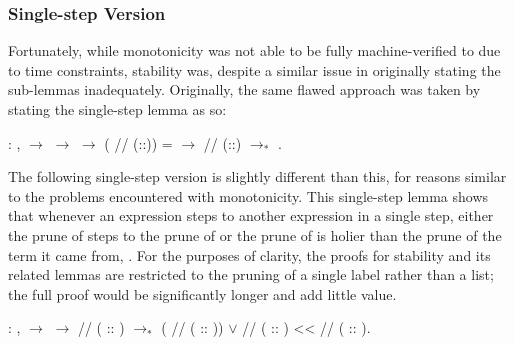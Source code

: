 \documentclass[12pt]{report}
\begin{document}
\subsubsection{Single-step Version}



Fortunately, while monotonicity was not able to be fully
machine-verified to due to time constraints, stability was, despite
a similar issue in originally stating the sub-lemmas inadequately.
Originally, the same flawed approach was taken by stating the
single-step lemma as so:

\begin{coqdoccode}
\coqdocemptyline
\coqdocindent{1.00em}
  : \coqdockw{\ensuremath{\forall}}   ,\coqdoceol
\coqdocindent{2.00em}
  \ensuremath{\rightarrow}\coqdoceol
\coqdocindent{2.00em}
 $\to$  \ensuremath{\rightarrow}\coqdoceol
\coqdocindent{2.00em}
(  //\coqdocvar{\_} (::)) =  \ensuremath{\rightarrow}\coqdoceol
\coqdocindent{2.00em}
  //\coqdocvar{\_} (::) $\to_*$ .\coqdoceol
\coqdocemptyline
\end{coqdoccode}

The following single-step version is slightly different than this,
for reasons similar to the problems encountered with monotonicity.
This single-step lemma shows that whenever an expression
 steps to another expression  in a single
step, either the prune of  steps to the prune of
 or the prune of  is holier than the prune
of the term it came from, . For the purposes of clarity,
the proofs for stability and its related lemmas are restricted to the
pruning of a single label rather than a list; the full proof would be
significantly longer and add little value.

\begin{coqdoccode}
\coqdocemptyline
\coqdocindent{1.00em}
  : \coqdockw{\ensuremath{\forall}}   ,\coqdoceol
\coqdocindent{2.00em}
 $\to$  \ensuremath{\rightarrow}\coqdoceol
\coqdocindent{2.00em}
  //\coqdocvar{\_} ( :: ) $\to_*$ (  //\coqdocvar{\_} ( :: ))\coqdoceol
\coqdocindent{2.00em}
\ensuremath{\lor}\coqdoceol
\coqdocindent{2.00em}
  //\coqdocvar{\_} ( :: ) <<   //\coqdocvar{\_} ( :: ).\coqdoceol
\coqdocemptyline
\end{coqdoccode}
\end{document}
